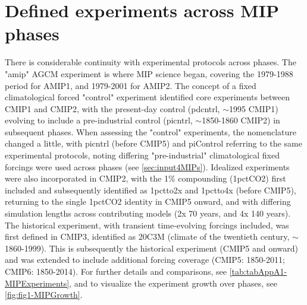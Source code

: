 \documentclass[gmd, preprint]{copernicus}
\begin{document}
\section{Defined experiments across MIP phases}    %
\label{sec:secAppA1-MIPExperiments}
There is considerable continuity with experimental protocols across phases. The "amip" AGCM experiment is where MIP science began, covering the 1979-1988 period for AMIP1, and 1979-2001 for AMIP2. The concept of a fixed climatological forced "control" experiment identified core experiments between CMIP1 and CMIP2, with the present-day control (pdcntrl, $\sim$1995 CMIP1) evolving to include a pre-industrial control (picntrl, $\sim$1850-1860 CMIP2) in subsequent phases. When assessing the "control" experiments, the nomenclature changed a little, with picntrl (before CMIP5) and piControl referring to the same experimental protocols, noting differing "pre-industrial" climatological fixed forcings were used across phases (see \autoref{sec:input4MIPs}). Idealized experiments were also incorporated in CMIP2, with the 1\% compounding (1pctCO2) first included and subsequently identified as 1pctto2x and 1pctto4x (before CMIP5), returning to the single 1pctCO2 identity in CMIP5 onward, and with differing simulation lengths across contributing models (2x 70 years, and 4x 140 years). The historical experiment, with transient time-evolving forcings included, was first defined in CMIP3, identified as 20C3M (climate of the twentieth century, $\sim$1860-1999). This is subsequently the historical experiment (CMIP5 and onward) and was extended to include additional forcing coverage (CMIP5: 1850-2011; CMIP6: 1850-2014). For further details and comparisons, see \autoref{tab:tabAppA1-MIPExperiments}, and to visualize the experiment growth over phases, see \autoref{fig:fig1-MIPGrowth}.
\end{document}
